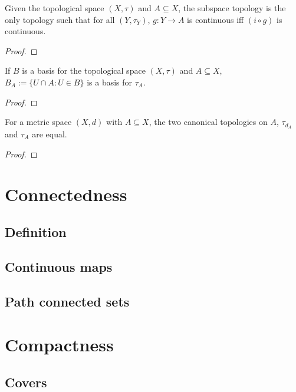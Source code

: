 \documentclass[../Year2.tex]{subfiles}
\begin{document}
\begin{theorem}
    Given the topological space $(X,\tau)$ and $A\subseteq X$, the subspace topology is the only topology such that for all $(Y,\tau_Y)$, $g:Y\rightarrow A$ is continuous iff $(i\circ g)$ is continuous.
    \begin{proof}
        
    \end{proof}
\end{theorem}

\begin{lemma}
    If $B$ is a basis for the topological space $(X,\tau)$ and $A\subseteq X$, $B_A:=\{U\cap A:U\in B\}$ is a basis for $\tau_A$.
    \begin{proof}
        
    \end{proof}
\end{lemma}

\begin{proposition}
    For a metric space $(X,d)$ with $A\subseteq X$, the two canonical topologies on $A$, $\tau_{d_A}$ and $\tau_A$ are equal. \begin{proof}
        
    \end{proof}
\end{proposition}

\section{Connectedness}

\subsection{Definition}

\subsection{Continuous maps}

\subsection{Path connected sets}

\section{Compactness}

\subsection{Covers}
\end{document}

